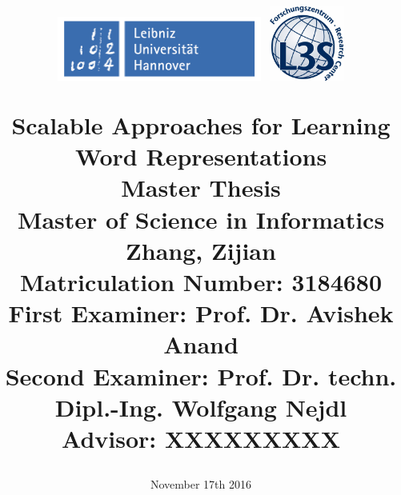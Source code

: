 \documentclass[12pt, a4paper, twoside, openright]{report}
\date{November 17th 2016}
\theoremstyle{definition}
\theoremstyle{named}
\theoremstyle{def}
\begin{document}
\parindent 0pt
\parskip 6pt

\title{
\begin{figure}[h!]
	\includegraphics[width=0.6\textwidth, valign=t]{Grafiken/luh_logo_rgb.jpg}
	\hfill
	\includegraphics[width=0.22\textwidth, valign=t]{Grafiken/l3slogo.png}
\end{figure}
\LARGE{\textbf{Scalable Approaches for Learning Word Representations}}
\\[2cm]
\normalsize{\textbf{Master Thesis}}\\
\normalsize{Master of Science in Informatics}
\\[2cm]
\normalsize{\textbf{Zhang, Zijian}}\\
\normalsize{Matriculation Number: 3184680}
\\[2cm]
\normalsize{First Examiner: Prof. Dr. Avishek Anand}\\
\normalsize{Second Examiner: Prof. Dr. techn. Dipl.-Ing. Wolfgang Nejdl }\\
\normalsize{Advisor: XXXXXXXXX}
}
\author{}
\maketitle


%




\tableofcontents

\parskip 12pt



\parskip 6pt

\nocite{*}
{}


\listoffigures
{}
\listoftables
\end{document}
